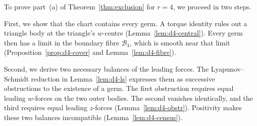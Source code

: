 \documentclass[Threeside,11pt]{article}
\theoremstyle{definition}
\theoremstyle{remark}
\numberwithin{equation}{section}
\theoremstyle{remark}
\begin{document}
{To prove part~(a) of Theorem~\ref{thm:exclusion} for $r=4$, we proceed in two steps.

First, we show that the chart contains every germ. A torque identity rules out a triangle
body at the triangle's $w$-centre (Lemma~\ref{lem:d4-central}).
Every germ then has a limit in the boundary fibre $\mathcal B_4$,
which is smooth near that limit (Proposition~\ref{prop:d4-cover} and Lemma~\ref{lem:d4-fibre}).

Second, we derive two necessary balances of the leading forces.
The Lyapunov--Schmidt reduction in Lemma~\ref{lem:d4-ls} expresses them as successive
obstructions to the existence of a germ. The first obstruction requires equal leading
$w$-forces on the two outer bodies. The second vanishes identically, and the third requires
equal leading $z$-forces (Lemma~\ref{lem:d4-obstr}).
{Positivity makes these two balances incompatible}
(Lemma~\ref{lem:d4-census}).}
\end{document}
